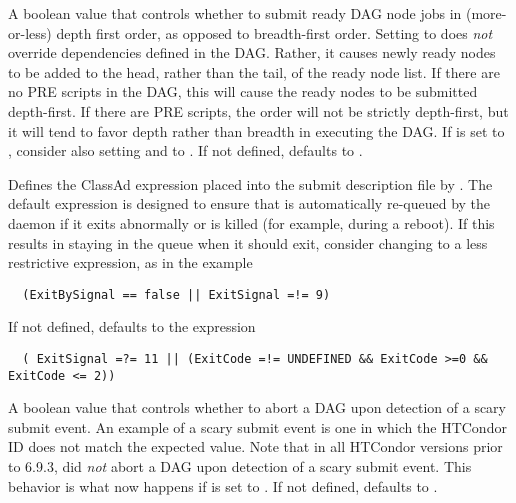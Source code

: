 \begin{description}
\label{param:DAGManSubmitDepthFirst}
\item[\Macro{DAGMAN\_SUBMIT\_DEPTH\_FIRST}]
  A boolean value that controls whether to submit ready DAG node jobs
  in (more-or-less) depth first order, as opposed to breadth-first order.
  Setting  to  does
  \emph{not} override dependencies defined in the DAG.  Rather, it
  causes newly ready nodes to be added to the head, rather than the tail,
  of the ready node list.  If there are no PRE scripts in the DAG, this
  will cause the ready nodes to be submitted depth-first.  If there
  are PRE scripts, the order will not be strictly depth-first, but it
  will tend to favor depth rather than breadth in executing the DAG.
  If  is set to ,
  consider also setting  and
   to .
  If not defined,  defaults to
  .

\label{param:DAGManOnExitRemove}
\item[\Macro{DAGMAN\_ON\_EXIT\_REMOVE}]
  Defines the  ClassAd expression placed
  into the  submit description file by .
  The default expression is designed to ensure that  is
  automatically re-queued by the  daemon if it exits abnormally
  or is killed (for example, during a reboot).
  If this results in 
  staying in the queue when it should exit, consider changing 
  to a less restrictive expression, as in the example
\footnotesize
\begin{verbatim}
  (ExitBySignal == false || ExitSignal =!= 9)
\end{verbatim}
\normalsize
  If not defined,  defaults to
  the expression
\footnotesize
\begin{verbatim}
  ( ExitSignal =?= 11 || (ExitCode =!= UNDEFINED && ExitCode >=0 && ExitCode <= 2))
\end{verbatim}
\normalsize

\item[\Macro{DAGMAN\_ABORT\_ON\_SCARY\_SUBMIT}]
\label{param:DAGManAbortOnScarySubmit}
  A boolean value that controls whether to abort a DAG upon detection of
  a scary submit event.
  An example of a scary submit event is one in which the HTCondor ID
  does not match the expected value.
  Note that in all HTCondor versions prior to 6.9.3,
   did \emph{not} abort a DAG upon detection of
  a scary submit event.
  This behavior is what now happens if
   is set to .
  If not defined,  defaults to
  .


\end{description}
